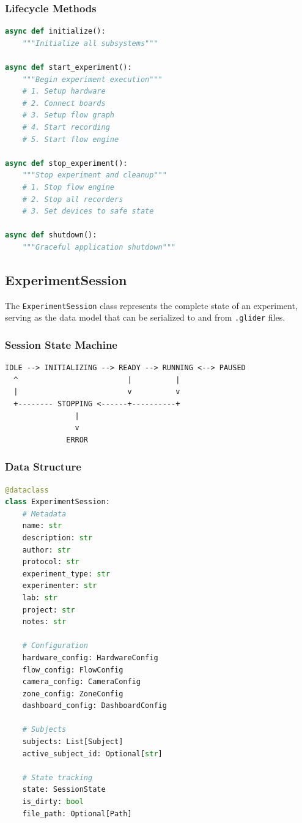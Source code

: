 \documentclass[11pt,a4paper]{article}
\begin{document}
\subsubsection{Lifecycle Methods}

\begin{lstlisting}[language=Python]
async def initialize():
    """Initialize all subsystems"""

async def start_experiment():
    """Begin experiment execution"""
    # 1. Setup hardware
    # 2. Connect boards
    # 3. Setup flow graph
    # 4. Start recording
    # 5. Start flow engine

async def stop_experiment():
    """Stop experiment and cleanup"""
    # 1. Stop flow engine
    # 2. Stop all recorders
    # 3. Set devices to safe state

async def shutdown():
    """Graceful application shutdown"""
\end{lstlisting}

\subsection{ExperimentSession}

The \texttt{ExperimentSession} class represents the complete state of an experiment, serving as the data model that can be serialized to and from \texttt{.glider} files.

\subsubsection{Session State Machine}

\begin{verbatim}
IDLE --> INITIALIZING --> READY --> RUNNING <--> PAUSED
  ^                         |          |
  |                         v          v
  +-------- STOPPING <------+----------+
                |
                v
              ERROR
\end{verbatim}

\subsubsection{Data Structure}

\begin{lstlisting}[language=Python]
@dataclass
class ExperimentSession:
    # Metadata
    name: str
    description: str
    author: str
    protocol: str
    experiment_type: str
    experimenter: str
    lab: str
    project: str
    notes: str

    # Configuration
    hardware_config: HardwareConfig
    flow_config: FlowConfig
    camera_config: CameraConfig
    zone_config: ZoneConfig
    dashboard_config: DashboardConfig

    # Subjects
    subjects: List[Subject]
    active_subject_id: Optional[str]

    # State tracking
    state: SessionState
    is_dirty: bool
    file_path: Optional[Path]
\end{lstlisting}
\end{document}
